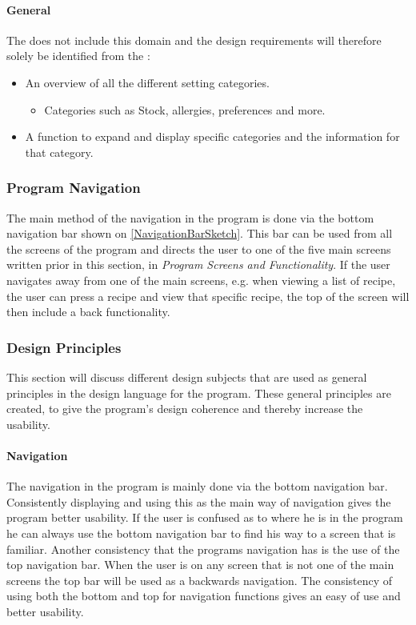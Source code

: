 \paragraph{General}   
The  does not include this domain and the design requirements will therefore solely be identified from the :

\begin{itemize}
	\item An overview of all the different setting categories.
		\begin{itemize}
			\item Categories such as Stock, allergies, preferences and more.
		\end{itemize}
	\item A function to expand and display specific categories and the information for that category.
\end{itemize} 
 
\subsubsection{Program Navigation}
The main method of the navigation in the program is done via the bottom navigation bar shown on \cref{NavigationBarSketch}. This bar can be used from all the screens of the program and directs the user to one of the five main screens written prior in this section, in \textit{Program Screens and Functionality}. If the user navigates away from one of the main screens, e.g. when viewing a list of recipe, the user can press a recipe and view that specific recipe, the top of the screen will then include a back functionality. 

\subsubsection{Design Principles}
This section will discuss different design subjects that are used as general principles in the design language for the program. These general principles are created, to give the program's design coherence and thereby increase the usability.

\paragraph{Navigation}
The navigation in the program is mainly done via the bottom navigation bar. Consistently displaying and using this as the main way of navigation gives the program better usability. If the user is confused as to where he is in the program he can always use the bottom navigation bar to find his way to a screen that is familiar. Another consistency that the programs navigation has is the use of the top navigation bar. When the user is on any screen that is not one of the main screens the top bar will be used as a backwards navigation. The consistency of using both the bottom and top for navigation functions gives an easy of use and better usability.

